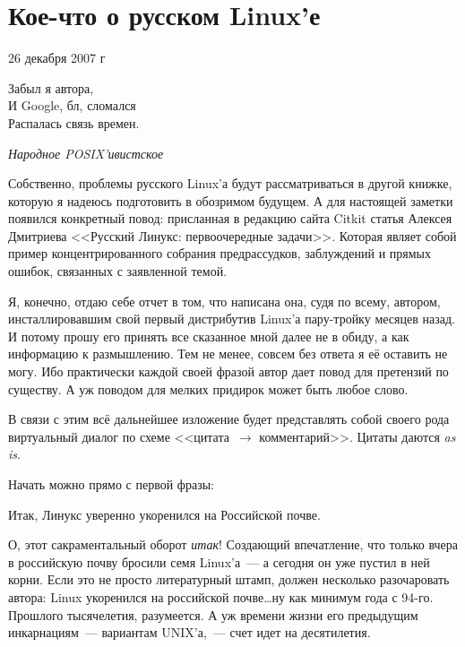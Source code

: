 \section{Кое-что о русском Linux'е} 

\begin{timeline}26 декабря 2007 г\end{timeline}

\hfill \begin{minipage}[h]{0.45\textwidth}
Забыл я автора,\\
И Google, бл, сломался\\
Распалась связь времен.
\begin{flushright}
\textit{Народное POSIX'ивистское}  
\end{flushright}
\bigskip\end{minipage}

Собственно, проблемы русского Linux'а будут рассматриваться в другой книжке, которую я надеюсь подготовить в обозримом будущем. А для настоящей заметки появился конкретный повод: присланная в редакцию сайта Citkit статья Алексея Дмитриева <<Русский Линукс: первоочередные задачи>>. Которая являет собой пример концентрированного собрания предрассудков, заблуждений и прямых ошибок, связанных с заявленной темой. 

Я, конечно, отдаю себе отчет в том, что написана она, судя по всему, автором, инсталлировавшим свой первый дистрибутив Linux'а пару-тройку месяцев назад. И потому прошу его принять все сказанное мной далее не в обиду, а как информацию к размышлению. Тем не менее, совсем без ответа я её оставить не могу. Ибо практически каждой своей фразой автор дает повод для претензий по существу. А уж поводом для мелких придирок может быть любое слово. 

В связи с этим всё дальнейшее изложение будет представлять собой своего рода виртуальный диалог по схеме <<цитата~$\rightarrow$  комментарий>>. Цитаты даются \textit{as is}. 

Начать можно прямо с первой фразы: 
\begin{shadequote}{}
Итак, Линукс уверенно укоренился на Российской почве.
\end{shadequote}
О, этот сакраментальный оборот \textit{итак}! Создающий впечатление, что только вчера в российскую почву бросили семя Linux'а~--- а сегодня он уже пустил в ней корни. Если это не просто литературный штамп, должен несколько разочаровать автора: Linux укоренился на российской почве\dots ну как минимум года с 94-го. Прошлого тысячелетия, разумеется. А уж времени жизни его предыдущим инкарнациям~--- вариантам UNIX'а,~--- счет идет на десятилетия. 


